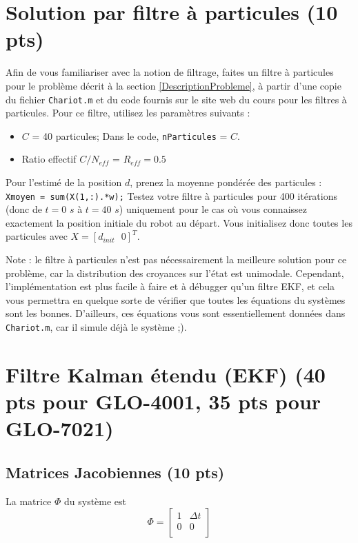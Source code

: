 \documentclass[12pt]{article}
\begin{document}
\section {Solution par filtre à particules (10 pts)}
\label{Particules}
Afin de vous familiariser avec la notion de filtrage, faites un filtre à particules pour le problème décrit à la section \ref{DescriptionProbleme}, à partir d'une copie du fichier \texttt{Chariot.m} et du code fournis sur le site web du cours pour les filtres à particules. Pour ce filtre, utilisez les paramètres suivants :
\begin{itemize}
\item $C$ = 40 particules; Dans le code, \texttt{nParticules} = $C$.
\item Ratio effectif $C/N_{eff}$ = $R_{eff} = 0.5$
\end{itemize}

Pour l'estimé de la position $d$, prenez la moyenne pondérée des particules : \texttt{Xmoyen = sum(X(1,:).*w);} Testez votre filtre à particules pour 400 itérations (donc de $t=0$ $s$ à $t=40$ $s$) uniquement pour le cas où vous connaissez exactement la position initiale du robot au départ. Vous initialisez donc toutes les particules avec $X=[d_{init} \mbox{ }0]^T$.

Note : le filtre à particules n'est pas nécessairement la meilleure solution pour ce problème, car la distribution des croyances sur l'état est unimodale. Cependant, l'implémentation est plus facile à faire et à débugger qu'un filtre EKF, et cela vous permettra en quelque sorte de vérifier que toutes les équations du systèmes sont les bonnes. D'ailleurs, ces équations vous sont essentiellement données dans \texttt{Chariot.m}, car il simule déjà le système ;).


\newpage
\section{Filtre Kalman étendu (EKF) (40 pts pour GLO-4001, 35 pts pour GLO-7021)}
\label{EKF}
\subsection{Matrices Jacobiennes (10 pts)}
La matrice $\Phi$ du système est
\begin{equation}
\Phi = \begin{bmatrix}
1 &  \Delta t  \\
0  &  0     \\
\end{bmatrix}
\end{equation}
\end{document}
